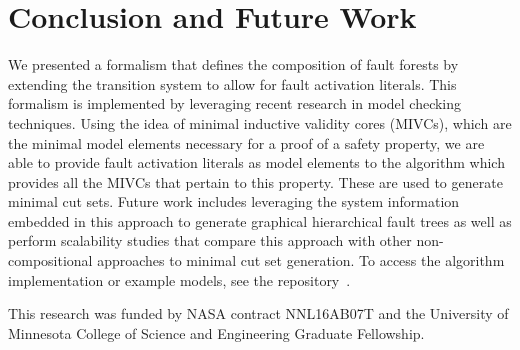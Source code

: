 \section{Conclusion and Future Work}
We presented a formalism that defines the composition of fault forests by extending the transition system to allow for fault activation literals. This formalism is implemented by leveraging recent research in model checking techniques. Using the idea of minimal inductive validity cores (MIVCs), which are the minimal model elements necessary for a proof of a safety property, we are able to provide fault activation literals as model elements to the \aivcalg algorithm which provides all the MIVCs that pertain to this property. These are used to generate minimal cut sets. Future work includes leveraging the system information embedded in this approach to generate graphical hierarchical fault trees as well as perform scalability studies that compare this approach with other non-compositional approaches to minimal cut set generation.  %
To access the algorithm implementation or example models, see the repository~\cite{SAGithub}. 

\vspace{2 mm}
 This research was funded by NASA contract NNL16AB07T and the University of Minnesota College of Science and Engineering Graduate Fellowship.


